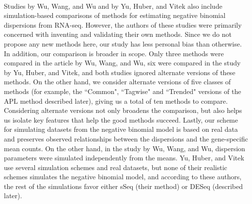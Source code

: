 \documentclass[10pt]{article}
\begin{document}
{ \paragraph{} \indent Studies by Wu, Wang, and Wu \cite{dss} and by Yu, Huber, and Vitek \cite{yu} also include simulation-based comparisons of methods for estimating negative binomial dispersions from RNA-seq. However, the authors of these studies were primarily concerned with inventing and validating their own methods. Since we do not propose any new methods here, our study has less personal bias than otherwise. In addition, our comparison is broader in scope. Only three methods were compared in the article by Wu, Wang, and Wu, six were compared in the study by Yu, Huber, and Vitek, and both studies ignored alternate versions of these methods. On the other hand, we consider alternate versions of five classes of methods (for example, the ``Common", ``Tagwise" and ``Trended" versions of the APL method described later), giving us a total of ten methods to compare. Considering alternate versions not only broadens the comparison, but also helps us isolate key features that help the good methods succeed. Lastly, our scheme for simulating datasets from the negative binomial model is based on real data and preserves observed relationships between the dispersions and the gene-specific mean counts. On the other hand, in the study by Wu, Wang, and Wu, dispersion parameters were simulated independently from the means. Yu, Huber, and Vitek use several simulation schemes and real datasets, but none of their realistic schemes simulates the negative binomial model, and according to these authors, the rest of the simulations favor either sSeq (their method) or DESeq (described later). }
\end{document}
